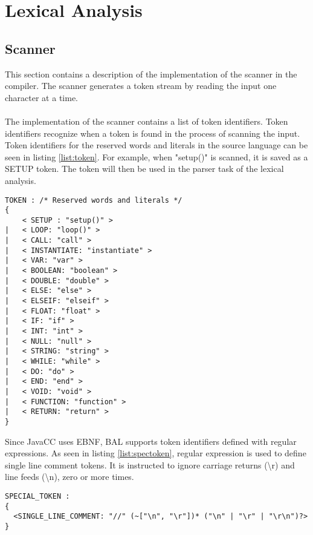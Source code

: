 \section{Lexical Analysis}
\subsection{Scanner}
This section contains a description of the implementation of the scanner in the compiler. The scanner generates a token stream by reading the input one character at a time.\\
\\The implementation of the scanner contains a list of token identifiers. Token identifiers recognize when a token is found in the process of scanning the input. Token identifiers for the reserved words and literals in the source language can be seen in listing \ref{list:token}. For example, when "setup()" is scanned, it is saved as a SETUP token. The token will then be used in the parser task of the lexical analysis. 

\begin{lstlisting}[caption=Token identifiers for reserved words and literals, label=list:token]
TOKEN : /* Reserved words and literals */
{
	< SETUP : "setup()" >
|	< LOOP: "loop()" >	
|	< CALL: "call" >
|	< INSTANTIATE: "instantiate" >
|	< VAR: "var" >
|	< BOOLEAN: "boolean" >
|	< DOUBLE: "double" >
|	< ELSE: "else" >
|	< ELSEIF: "elseif" >
|	< FLOAT: "float" >
|	< IF: "if" >
|	< INT: "int" >
|	< NULL: "null" >
|	< STRING: "string" >
|	< WHILE: "while" >
| 	< DO: "do" >
| 	< END: "end" >
|   < VOID: "void" >
|   < FUNCTION: "function" >
|   < RETURN: "return" >
}

\end{lstlisting}
Since JavaCC uses EBNF, BAL supports token identifiers defined with regular expressions. As seen in listing \ref{list:spectoken}, regular expression is used to define single line comment tokens. It is instructed to ignore carriage returns (\textbackslash{r}) and line feeds (\textbackslash{n}), zero or more times. 

\begin{lstlisting}[caption=Special token for single line comment, label=list:spectoken]
SPECIAL_TOKEN :
{
  <SINGLE_LINE_COMMENT: "//" (~["\n", "\r"])* ("\n" | "\r" | "\r\n")?>
}
\end{lstlisting}


 
